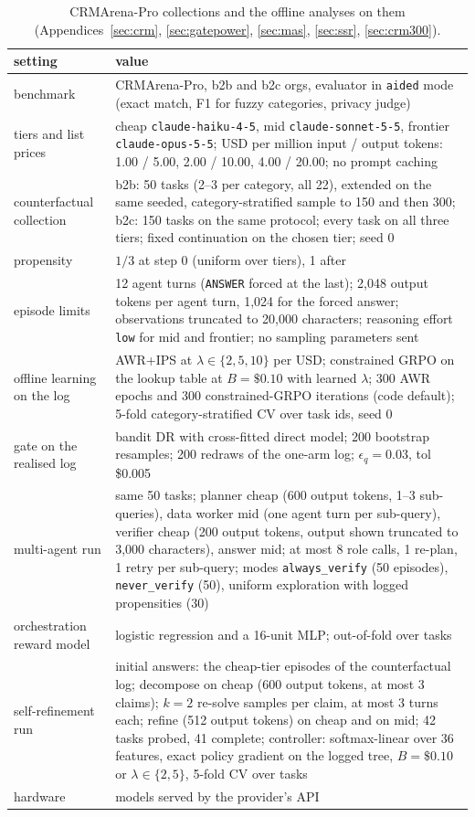 \documentclass[10pt]{article}
\newcommand{\code}[1]{\texttt{#1}}
\begin{document}
\begin{table}[H]
\centering\footnotesize
\caption{CRMArena-Pro collections and the offline analyses on them (Appendices~\ref{sec:crm}, \ref{sec:gatepower}, \ref{sec:mas}, \ref{sec:ssr}, \ref{sec:crm300}).}
\label{tab:det-collect}
\begin{tabular}{p{4.0cm}p{11.6cm}}
\toprule
setting & value \\
\midrule
benchmark & CRMArena-Pro, b2b and b2c orgs, evaluator in \code{aided} mode (exact match, F1 for fuzzy categories, privacy judge) \\
tiers and list prices & cheap \code{claude-haiku-4-5}, mid \code{claude-sonnet-5-5}, frontier \code{claude-opus-5-5}; USD per million input / output tokens: 1.00 / 5.00, 2.00 / 10.00, 4.00 / 20.00; no prompt caching \\
counterfactual collection & b2b: 50 tasks (2--3 per category, all 22), extended on the same seeded, category-stratified sample to 150 and then 300; b2c: 150 tasks on the same protocol; every task on all three tiers; fixed continuation on the chosen tier; seed 0 \\
propensity & $1/3$ at step 0 (uniform over tiers), 1 after \\
episode limits & 12 agent turns (\code{ANSWER} forced at the last); 2{,}048 output tokens per agent turn, 1{,}024 for the forced answer; observations truncated to 20{,}000 characters; reasoning effort \code{low} for mid and frontier; no sampling parameters sent \\
offline learning on the log & AWR+IPS at $\lambda\in\{2,5,10\}$ per USD; constrained GRPO on the lookup table at $B=\$0.10$ with learned $\lambda$; 300 AWR epochs and 300 constrained-GRPO iterations (code default); 5-fold category-stratified CV over task ids, seed 0 \\
gate on the realised log & bandit DR with cross-fitted direct model; 200 bootstrap resamples; 200 redraws of the one-arm log; $\epsilon_q=0.03$, tol \$0.005 \\
multi-agent run & same 50 tasks; planner cheap (600 output tokens, 1--3 sub-queries), data worker mid (one agent turn per sub-query), verifier cheap (200 output tokens, output shown truncated to 3{,}000 characters), answer mid; at most 8 role calls, 1 re-plan, 1 retry per sub-query; modes \code{always\_verify} (50 episodes), \code{never\_verify} (50), uniform exploration with logged propensities (30) \\
orchestration reward model & logistic regression and a 16-unit MLP; out-of-fold over tasks \\
self-refinement run & initial answers: the cheap-tier episodes of the counterfactual log; decompose on cheap (600 output tokens, at most 3 claims); $k=2$ re-solve samples per claim, at most 3 turns each; refine (512 output tokens) on cheap and on mid; 42 tasks probed, 41 complete; controller: softmax-linear over 36 features, exact policy gradient on the logged tree, $B=\$0.10$ or $\lambda\in\{2,5\}$, 5-fold CV over tasks \\
hardware & models served by the provider's API \\
\bottomrule
\end{tabular}
\end{table}
\end{document}
